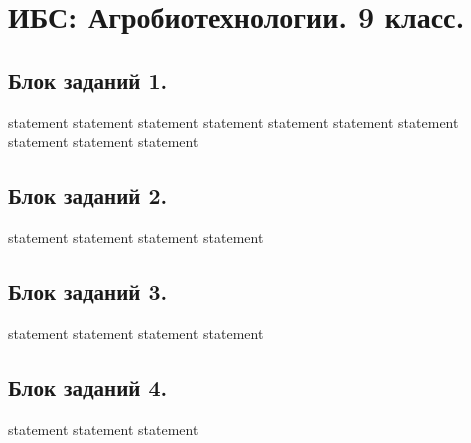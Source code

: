 \chapter{ИБС: Агробиотехнологии. 9 класс.}

\section{Блок заданий 1.}

{statement}
{statement}
{statement}
{statement}
{statement}
{statement}
{statement}
{statement}
{statement}
{statement}

\section{Блок заданий 2.}

{statement}
{statement}
{statement}
{statement}

\section{Блок заданий 3.}

{statement}
{statement}
{statement}
{statement}

\section{Блок заданий 4.}

{statement}
{statement}
{statement}